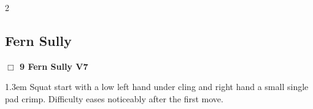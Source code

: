 \begin{multicols}{2}
\subsection*{Fern Sully}\label{bf:Fern Sully}
\needspace{2em}
\label{rt:Fern Sully}
\colorbox{Goldenrod!20}{
\parbox{0.95\linewidth}{
\hspace{-1ex}\textbf{$\Box$
9 Fern Sully V7  
}}}
\begin{adjustwidth}{1.3em}{}			
Squat start with a low left hand under cling and right hand a small single pad crimp. Difficulty eases noticeably after the first move.
\end{adjustwidth}
	\end{multicols}
\clearpage